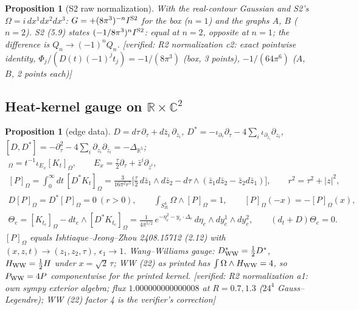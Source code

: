 \documentclass[10pt,a4paper]{article}
\numberwithin{equation}{section}
\newtheorem{proposition}[theorem]{Proposition}
\theoremstyle{definition}
\theoremstyle{remark}
\newcommand{\zb}{\bar z}
\newcommand{\ver}[1]{\textup{[verified: #1]}}
\begin{document}
\begin{proposition}[S2 raw normalization]\label{prop-S2norm}
With the real-contour Gaussian and S2's $\Omega=i\,dx^1dx^2dx^3$: $G=+(8\pi^3)^{-n}I^{\rm S2}$ for the box ($n=1$) and the graphs $A$, $B$ ($n=2$). S2 (5.9) states $(-1/8\pi^3)^nI^{\rm S2}$: equal at $n=2$, opposite at $n=1$; the difference is $Q_n\to(-1)^nQ_n$. \ver{R2 normalization c2: exact pointwise identity, $\Phi_j/(D(t)(-1)^jt_j)=-1/(8\pi^3)$ (box, 3 points), $-1/(64\pi^6)$ ($A$, $B$, 2 points each)}
\end{proposition}

\subsection{\texorpdfstring{Heat-kernel gauge on $\mathbb R\times\mathbb C^2$}{Heat-kernel gauge on R x C2}}\label{sec-gauge}

\begin{proposition}[edge data]\label{prop-gauge}
$D=d\tau\,\partial_\tau+d\zb_i\,\partial_{\zb_i}$, $D^*=-\iota_{\partial_\tau}\partial_\tau-4\sum_i\iota_{\partial_{\zb_i}}\partial_{z_i}$, $[D,D^*]=-\partial_\tau^2-4\sum_i\partial_{z_i}\partial_{\zb_i}=-\Delta_{\mathbb R^5}$;
\begin{gather}
[D^*K_t]_\Omega=t^{-1}\iota_{E_x}[K_t]_\Omega,\qquad E_x=\tfrac\tau2\partial_\tau+\zb^i\partial_{\zb^i},\\
[P]_\Omega=\int_0^\infty dt\,[D^*K_t]_\Omega=\frac{3}{16\pi^2r^5}\Big[\frac\tau2\,d\zb_1\wedge d\zb_2-d\tau\wedge(\zb_1d\zb_2-\zb_2d\zb_1)\Big],\qquad r^2=\tau^2+|z|^2,\\
D[P]_\Omega=D^*[P]_\Omega=0\ (r>0),\qquad \int_{S^4_R}\Omega\wedge[P]_\Omega=1,\qquad [P]_\Omega(-x)=-[P]_\Omega(x),\\
\Theta_e=[K_{t_e}]_\Omega-dt_e\wedge[D^*K_{t_e}]_\Omega=\frac1{4\pi^{5/2}}\,e^{-\eta_e^2-y_e\cdot\Delta_e}\,d\eta_e\wedge dy^1_e\wedge dy^2_e,\qquad(d_t+D)\Theta_e=0 .
\end{gather}
$[P]_\Omega$ equals Ishtiaque--Jeong--Zhou 2408.15712 (2.12) with $(x,z,t)\to(z_1,z_2,\tau)$, $\epsilon_1\to1$. Wang--Williams gauge: $D^*_{\rm WW}=\frac12D^*$, $H_{\rm WW}=\frac12H$ under $x=\sqrt2\,\tau$; WW (22) as printed has $\int\Omega\wedge H_{\rm WW}=4$, so $P_{\rm WW}=4P$ componentwise for the printed kernel.
\ver{R2 normalization a1: own sympy exterior algebra; flux $1.000000000000008$ at $R=0.7,1.3$ ($24^4$ Gauss--Legendre); WW (22) factor 4 is the verifier's correction}
\end{proposition}
\end{document}
